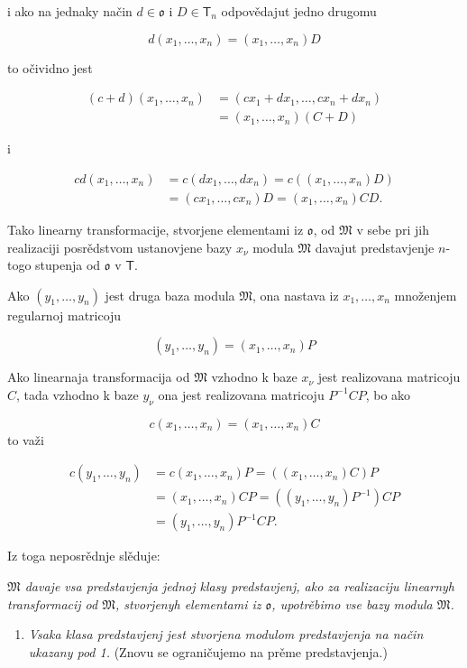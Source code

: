 \documentclass[11pt]{article}
\providecommand{\tightlist}{\setlength{\itemsep}{0pt}\setlength{\parskip}{0pt}}
\begin{document}
i ako na jednaky način \(d\in\mathfrak{o}\) i \(D\in\mathsf T_n\) odpovědajut jedno drugomu

\[
d(x_1,\ldots,x_n)=(x_1,\ldots,x_n)D
\]

to očividno jest

\[
\begin{aligned}
(c+d)(x_1,\ldots,x_n)
&=(cx_1+dx_1,\ldots,cx_n+dx_n)\\
&=(x_1,\ldots,x_n)(C+D)
\end{aligned}
\]

i

\[
\begin{aligned}
cd(x_1,\ldots,x_n)
&=c(dx_1,\ldots,dx_n)=c((x_1,\ldots,x_n)D)\\
&=(cx_1,\ldots,cx_n)D=(x_1,\ldots,x_n)CD.
\end{aligned}
\]

Tako linearny transformacije, stvorjene elementami iz \(\mathfrak{o}\), od \(\mathfrak M\) v sebe pri jih realizaciji posrědstvom ustanovjene bazy \(x_\nu\) modula \(\mathfrak M\) davajut predstavjenje \(n\)-togo stupenja od \(\mathfrak{o}\) v \(\mathsf T\).

Ako \((y_1,\ldots,y_n)\) jest druga baza modula \(\mathfrak M\), ona nastava iz \(x_1,\ldots,x_n\) množenjem regularnoj matricoju

\[(y_1,\ldots,y_n)=(x_1,\ldots,x_n)P\]

Ako linearnaja transformacija od \(\mathfrak M\) vzhodno k baze \(x_\nu\) jest realizovana matricoju \(C\), tada vzhodno k baze \(y_\nu\) ona jest realizovana matricoju \(P^{-1}CP\), bo ako

\[c(x_1,\ldots,x_n)=(x_1,\ldots,x_n)C\]
to važi

\[
\begin{aligned}
c(y_1,\ldots,y_n)
&=c(x_1,\ldots,x_n)P=((x_1,\ldots,x_n)C)P\\
&=(x_1,\ldots,x_n)CP=((y_1,\ldots,y_n)P^{-1})CP\\
&=(y_1,\ldots,y_n)P^{-1}CP.
\end{aligned}
\]

Iz toga neposrědnje slěduje:

\emph{\(\mathfrak M\) davaje vsa predstavjenja jednoj klasy predstavjenj, ako za realizaciju linearnyh transformacij od \(\mathfrak M\), stvorjenyh elementami iz \(\mathfrak{o}\), upotrěbimo vse bazy modula \(\mathfrak M\).}

\begin{enumerate}
\def\labelenumi{\arabic{enumi}.}
\setcounter{enumi}{1}
\tightlist
\item
  \emph{Vsaka klasa predstavjenj jest stvorjena modulom predstavjenja na način ukazany pod 1.} (Znovu se ograničujemo na prěme predstavjenja.)
\end{enumerate}
\end{document}
